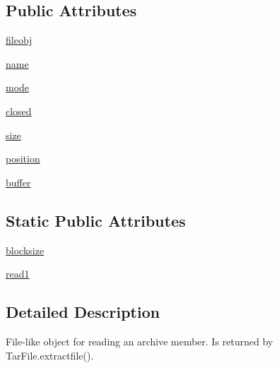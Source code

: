 \subsection*{Public Attributes}
\begin{DoxyCompactItemize}
\item 
\hyperlink{classpip_1_1__vendor_1_1distlib_1_1__backport_1_1tarfile_1_1ExFileObject_a9989dbf5356d2587fbb9c70a1c0ad8cc}{fileobj}
\item 
\hyperlink{classpip_1_1__vendor_1_1distlib_1_1__backport_1_1tarfile_1_1ExFileObject_a988b36e7eb48b1de92bcbacfb7ce1a4f}{name}
\item 
\hyperlink{classpip_1_1__vendor_1_1distlib_1_1__backport_1_1tarfile_1_1ExFileObject_a2c0118697f1cc5ade2eba2ab1cbe153d}{mode}
\item 
\hyperlink{classpip_1_1__vendor_1_1distlib_1_1__backport_1_1tarfile_1_1ExFileObject_a17ce79b96b7c6fe86702a97111fd0b5c}{closed}
\item 
\hyperlink{classpip_1_1__vendor_1_1distlib_1_1__backport_1_1tarfile_1_1ExFileObject_a5ddd1002fc99b7e3796697abb39e16c7}{size}
\item 
\hyperlink{classpip_1_1__vendor_1_1distlib_1_1__backport_1_1tarfile_1_1ExFileObject_ad5d887c11a81e9a86ddbea231dbcb8c2}{position}
\item 
\hyperlink{classpip_1_1__vendor_1_1distlib_1_1__backport_1_1tarfile_1_1ExFileObject_a3cdee161e7e258eafaeafde43e325a7e}{buffer}
\end{DoxyCompactItemize}
\subsection*{Static Public Attributes}
\begin{DoxyCompactItemize}
\item 
\hyperlink{classpip_1_1__vendor_1_1distlib_1_1__backport_1_1tarfile_1_1ExFileObject_a7af4a729d00ef82ae5cb89688188e4f9}{blocksize}
\item 
\hyperlink{classpip_1_1__vendor_1_1distlib_1_1__backport_1_1tarfile_1_1ExFileObject_a0aa3859740c36c45b891cebde6dc782b}{read1}
\end{DoxyCompactItemize}


\subsection{Detailed Description}
\begin{DoxyVerb}File-like object for reading an archive member.
   Is returned by TarFile.extractfile().
\end{DoxyVerb}
 

